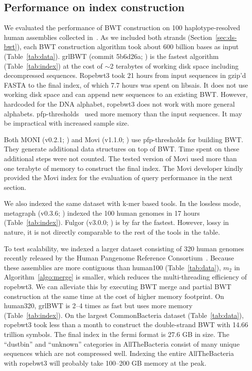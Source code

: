 \documentclass[webpdf,contemporary,large,namedate]{oup-authoring-template}%
\begin{document}
\subsection{Performance on index construction}

We evaluated the performance of BWT construction on 100 haplotype-resolved human assemblies collected in~\citet{Li:2024ab}.
As we included both strands (Section~\ref{sec:ds-bwt}), each BWT construction algorithm took about 600 billion bases as input (Table~\ref{tab:data}).
grlBWT (commit 5b6d26a; \citealt*{DBLP:journals/iandc/DiazDominguezN23}) is the fastest algorithm (Table~\ref{tab:index})
at the cost of $\sim$2 terabytes of working disk space including decompressed sequences.
Ropebwt3 took 21 hours from input sequences in gzip'd FASTA to the final index, of which 7.7 hours was spent on libsais.
It does not use working disk space and can append new sequences to an existing BWT.
However, hardcoded for the DNA alphabet, ropebwt3 does not work with more general alphabets.
pfp-thresholds~\citep{Rossi:2022aa} used more memory than the input sequences.
It may be impractical with increased sample size.

Both MONI (v0.2.1; \citealt*{Rossi:2022aa}) and Movi (v1.1.0; \citealt*{Zakeri:2024aa}) use pfp-thresholds for building BWT.
They generate additional data structures on top of BWT.
Time spent on these additional steps were not counted.
The tested version of Movi used more than one terabyte of memory to construct the final index.
The Movi developer kindly provided the Movi index for the evaluation of query performance in the next section.

We also indexed the same dataset with k-mer based tools.
In the lossless mode, metagraph (v0.3.6; \citealt*{Karasikov2020.10.01.322164}) indexed the 100 human genomes in 17 hours (Table~\ref{tab:index}).
Fulgor (v3.0.0; \citealt*{Fan:2024aa}) is by far the fastest.
However, lossy in nature, it is not directly comparable to the rest of the tools in the table.

To test scalability, we indexed a larger dataset consisting of 320 human genomes recently released by the Human Pangenome Reference Consortium~\citep{Liao:2023aa}.
Because these assemblies are more contiguous than human100 (Table~\ref{tab:data}), $m_2$ in Algorithm~\ref{algo:merge} is smaller, which reduces the multi-threading efficiency of ropebwt3.
We can alleviate this by executing BWT merge and partial BWT construction at the same time at the cost of higher memory footprint.
On human320, grlBWT is 2--4 times as fast but uses more memory (Table~\ref{tab:index}).
On the largest CommonBacteria dataset (Table~\ref{tab:data}),
ropebwt3 took less than a month to construct the double-strand BWT with 14.66 trillion symbols.
The final index in the fermi format is 27.6 GB in size.
The ``dustbin'' and ``unknown'' categories in AllTheBacteria consist of many unique sequences which are not compressed well.
Indexing the entire AllTheBacteria with ropebwt3 will probably take 100--200 GB memory at the peak.
\end{document}
